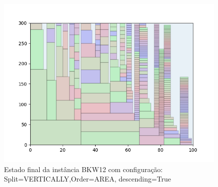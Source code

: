 \begin{figure}[H]
    \centering
    \caption[]{Estado final da instância BKW12 com configuração: Split=VERTICALLY,Order=AREA, descending=True}
    \label{fig:bkw12-vertically-area-true}
    \includegraphics[scale=0.5]{output/figures/bkw/bkw12/vertically/area/true/000}
\end{figure}